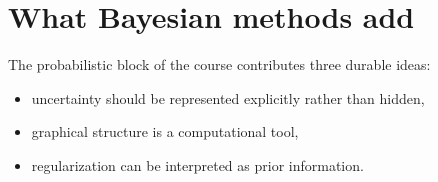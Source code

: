 \section{What Bayesian methods add}

The probabilistic block of the course contributes three durable ideas:
\begin{itemize}
  \item uncertainty should be represented explicitly rather than hidden,
  \item graphical structure is a computational tool,
  \item regularization can be interpreted as prior information.
\end{itemize}
